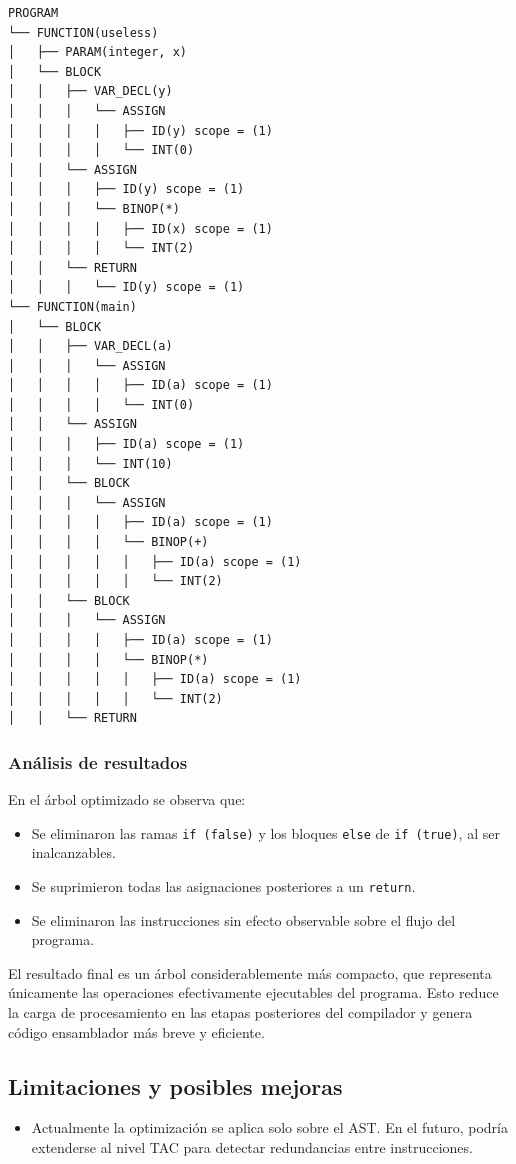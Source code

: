 \documentclass[12pt,a4paper]{article}
\begin{document}
\begin{itemize}
\begin{verbatim}
PROGRAM
└── FUNCTION(useless)
│   ├── PARAM(integer, x)
│   └── BLOCK
│   │   ├── VAR_DECL(y)
│   │   │   └── ASSIGN
│   │   │   │   ├── ID(y) scope = (1)
│   │   │   │   └── INT(0)
│   │   └── ASSIGN
│   │   │   ├── ID(y) scope = (1)
│   │   │   └── BINOP(*)
│   │   │   │   ├── ID(x) scope = (1)
│   │   │   │   └── INT(2)
│   │   └── RETURN
│   │   │   └── ID(y) scope = (1)
└── FUNCTION(main)
│   └── BLOCK
│   │   ├── VAR_DECL(a)
│   │   │   └── ASSIGN
│   │   │   │   ├── ID(a) scope = (1)
│   │   │   │   └── INT(0)
│   │   └── ASSIGN
│   │   │   ├── ID(a) scope = (1)
│   │   │   └── INT(10)
│   │   └── BLOCK
│   │   │   └── ASSIGN
│   │   │   │   ├── ID(a) scope = (1)
│   │   │   │   └── BINOP(+)
│   │   │   │   │   ├── ID(a) scope = (1)
│   │   │   │   │   └── INT(2)
│   │   └── BLOCK
│   │   │   └── ASSIGN
│   │   │   │   ├── ID(a) scope = (1)
│   │   │   │   └── BINOP(*)
│   │   │   │   │   ├── ID(a) scope = (1)
│   │   │   │   │   └── INT(2)
│   │   └── RETURN
\end{verbatim}

\subsubsection*{Análisis de resultados}

En el árbol optimizado se observa que:
\begin{itemize}
    \item Se eliminaron las ramas \texttt{if (false)} y los bloques \texttt{else} de \texttt{if (true)}, al ser inalcanzables.
    \item Se suprimieron todas las asignaciones posteriores a un \texttt{return}.
    \item Se eliminaron las instrucciones sin efecto observable sobre el flujo del programa.
\end{itemize}

El resultado final es un árbol considerablemente más compacto, que representa únicamente las operaciones efectivamente ejecutables del programa. 
Esto reduce la carga de procesamiento en las etapas posteriores del compilador y genera código ensamblador más breve y eficiente.


\end{itemize}

\subsection{Limitaciones y posibles mejoras}
\begin{itemize}
    \item Actualmente la optimización se aplica solo sobre el AST. En el futuro, podría extenderse al nivel TAC para detectar redundancias entre instrucciones.
\end{itemize}
\end{document}
